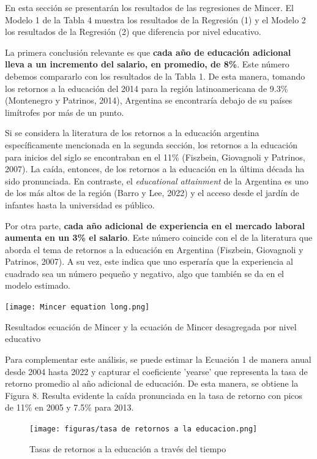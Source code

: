 \documentclass[a4paper]{article}
\theoremstyle{plain}
\theoremstyle{definition}
\begin{document}
En esta sección se presentarán los resultados de las regresiones de Mincer. El Modelo 1 de la Tabla 4 muestra los resultados de la Regresión (1) y el Modelo 2 los resultados de la Regresión (2) que diferencia por nivel educativo. 

La primera conclusión relevante es que \textbf{cada año de educación adicional lleva a un incremento del salario, en promedio, de 8\%}. Este número debemos compararlo con los resultados de la Tabla 1. De esta manera, tomando los retornos a la educación del 2014 para la región latinoamericana de 9.3\% (Montenegro y Patrinos, 2014), Argentina se encontraría debajo de su países limítrofes por más de un punto. 

Si se considera la literatura de los retornos a la educación argentina específicamente mencionada en la segunda sección, los retornos a la educación para inicios del siglo se encontraban en el 11\% (Fiszbein, Giovagnoli y Patrinos, 2007). La caída, entonces, de los retornos a la educación en la última década ha sido pronunciada. En contraste, el \textit{educational attainment} de la Argentina es uno de los más altos de la región (Barro y Lee, 2022) y el acceso desde el jardín de infantes hasta la universidad es público. 

Por otra parte, \textbf{cada año adicional de experiencia en el mercado laboral aumenta en un 3\% el salario}. Este número coincide con el de la literatura que aborda el tema de retornos a la educación en Argentina (Fiszbein, Giovagnoli y Patrinos, 2007). A su vez, este indica que uno esperaría que la experiencia al cuadrado sea un número pequeño y negativo, algo que también se da en el modelo estimado. 

\newpage
\begin{table}[!h]
    \centering
    \texttt{[image: Mincer equation long.png]}
    \caption{Resultados ecuación de Mincer y la ecuación de Mincer desagregada por nivel educativo} 
\end{table}

Para complementar este análisis, se puede estimar la Ecuación 1 de manera anual desde 2004 hasta 2022 y capturar el coeficiente 'yearse' que representa la tasa de retorno promedio al año adicional de educación. De esta manera, se obtiene la Figura 8. Resulta evidente la caída pronunciada en la tasa de retorno con picos de 11\% en 2005 y 7.5\% para 2013. 


\newpage
\begin{figure}[h]
    \centering
    \texttt{[image: figuras/tasa de retornos a la educacion.png]}
    \caption{Tasas de retornos a la educación a través del tiempo}
    \label{fig:my_label}
\end{figure}
\end{document}
